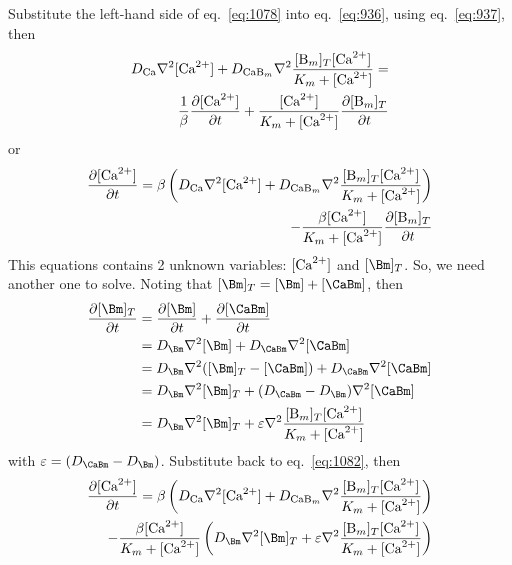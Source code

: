 Substitute the left-hand side of eq.~\eqref{eq:1078} into
eq.~\eqref{eq:936}, using eq.~\eqref{eq:937}, then
\begin{equation}
  \label{eq:1080}
  \begin{split}
    D_{\ce{Ca}}\nabla^2[\Ca] + D_{\ce{CaB_m}}\nabla^2
    \frac{[\ce{B_m}]_T[\Ca]}{K_m+[\Ca]} = \\
    \frac{1}{\beta}
    \frac{\partial [\Ca]}{\partial t} +  \frac{[\Ca]}{K_m+[\Ca]} \frac{\partial
      [\ce{B_m}]_T}{\partial t}
  \end{split}
\end{equation}
or 
\begin{equation}
  \label{eq:1081}
  \begin{split}
    \frac{\partial [\Ca]}{\partial t} =    \beta\left(D_{\ce{Ca}}\nabla^2[\Ca] + D_{\ce{CaB_m}}\nabla^2
    \frac{[\ce{B_m}]_T[\Ca]}{K_m+[\Ca]}\right)  \\
  -  \frac{\beta[\Ca]}{K_m+[\Ca]} \frac{\partial
      [\ce{B_m}]_T}{\partial t}
  \end{split}
\end{equation}
This equations contains 2 unknown variables: $[{\text{Ca}^{2+}}]$ and
$[\Bm]_T$. So, we need another one to solve. Noting that
$[\Bm]_T = [\Bm]+[\CaBm]$, then
\begin{equation}
  \label{eq:1082}
  \begin{split}
    \frac{\partial [\Bm]_T}{\partial t} &= \frac{\partial [\Bm]}{\partial
      t} + \frac{\partial [\CaBm]}{\partial t} \\
    &= D_\Bm\nabla^2[\Bm] + D_\CaBm\nabla^2[\CaBm] \\
    &= D_\Bm\nabla^2([\Bm]_T-[\CaBm]) + D_\CaBm\nabla^2[\CaBm] \\
    &= D_\Bm\nabla^2[\Bm]_T + (D_\CaBm-D_\Bm) \nabla^2[\CaBm]  \\
    &= D_\Bm\nabla^2[\Bm]_T + \varepsilon \nabla^2\frac{[\ce{B_m}]_T[\Ca]}{K_m+[\Ca]}
  \end{split}
\end{equation}
with $\varepsilon = (D_\CaBm-D_\Bm)$. Substitute back to
eq.~\eqref{eq:1082}, then 
\begin{equation}
  \label{eq:1083}
  \begin{split}
    \frac{\partial [\Ca]}{\partial t} =    \beta\left(D_{\ce{Ca}}\nabla^2[\Ca] + D_{\ce{CaB_m}}\nabla^2
      \frac{[\ce{B_m}]_T[\Ca]}{K_m+[\Ca]}\right)  \\
    -  \frac{\beta[\Ca]}{K_m+[\Ca]} \left(  D_\Bm\nabla^2[\Bm]_T +
      \varepsilon \nabla^2\frac{[\ce{B_m}]_T[\Ca]}{K_m+[\Ca]} \right)
  \end{split}  
\end{equation}
  
